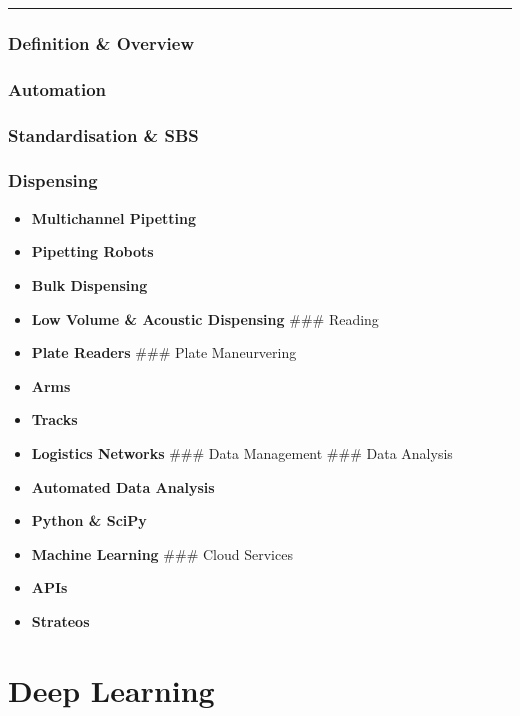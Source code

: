 \begin{center}\rule{0.5\linewidth}{0.5pt}\end{center}

\hypertarget{definition-overview}{%
\subsubsection{Definition \& Overview}\label{definition-overview}}

\hypertarget{automation}{%
\subsubsection{Automation}\label{automation}}

\hypertarget{standardisation-sbs}{%
\subsubsection{Standardisation \& SBS}\label{standardisation-sbs}}

\hypertarget{dispensing}{%
\subsubsection{Dispensing}\label{dispensing}}

\begin{itemize}
\tightlist
\item
  \textbf{Multichannel Pipetting}
\item
  \textbf{Pipetting Robots}
\item
  \textbf{Bulk Dispensing}
\item
  \textbf{Low Volume \& Acoustic Dispensing} \#\#\# Reading
\item
  \textbf{Plate Readers} \#\#\# Plate Maneurvering
\item
  \textbf{Arms}
\item
  \textbf{Tracks}
\item
  \textbf{Logistics Networks} \#\#\# Data Management \#\#\# Data
  Analysis
\item
  \textbf{Automated Data Analysis}
\item
  \textbf{Python \& SciPy}
\item
  \textbf{Machine Learning} \#\#\# Cloud Services
\item
  \textbf{APIs}
\item
  \textbf{Strateos}
\end{itemize}

\hypertarget{deep-learning-1}{%
\section{Deep Learning}\label{deep-learning-1}}

